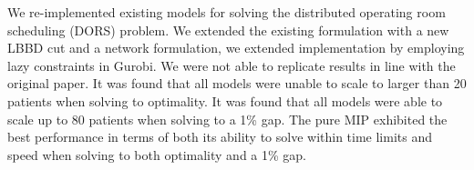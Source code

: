 We re-implemented existing models\cite{roshanaei2017propagating} for solving the distributed operating room scheduling (DORS) problem. We extended the existing formulation with a new LBBD cut and a network formulation, we extended implementation by employing lazy constraints in Gurobi. We were not able to replicate results in line with the original paper. It was found that all models were unable to scale to larger than 20 patients when solving to optimality. It was found that all models were able to scale up to 80 patients when solving to a 1\% gap. The pure MIP exhibited the best performance in terms of both its ability to solve within time limits and speed when solving to both optimality and a 1\% gap. 

